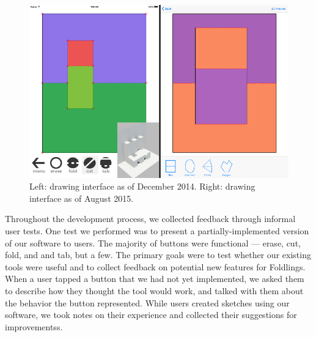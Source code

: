 \begin{figure}[htbp]
\centering
\includegraphics{figures/31_UI_Interface_Iteration/beforeafterinface.pdf}
\caption{Left: drawing interface as of December 2014. Right: drawing
interface as of August 2015.}
\end{figure}

Throughout the development process, we collected feedback through
informal user tests. One test we performed was to present a
partially-implemented version of our software to users. The majority of
buttons were functional --- erase, cut, fold, and and tab, but a few.
The primary goals were to test whether our existing tools were useful
and to collect feedback on potential new features for Foldlings. When a
user tapped a button that we had not yet implemented, we asked them to
describe how they thought the tool would work, and talked with them
about the behavior the button represented. While users created sketches
using our software, we took notes on their experience and collected
their suggestions for improvementss.


